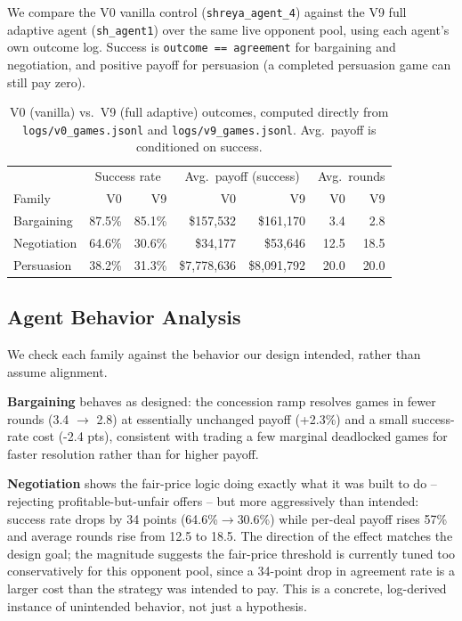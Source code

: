 \documentclass{article}
\begin{document}
We compare the V0 vanilla control (\texttt{shreya\_agent\_4}) against the V9 full adaptive agent (\texttt{sh\_agent1}) over the same live opponent pool, using each agent's own outcome log. Success is \texttt{outcome == agreement} for bargaining and negotiation, and positive payoff for persuasion (a completed persuasion game can still pay zero).

\begin{table}[t]
\caption{V0 (vanilla) vs.\ V9 (full adaptive) outcomes, computed directly from \texttt{logs/v0\_games.jsonl} and \texttt{logs/v9\_games.jsonl}. Avg.\ payoff is conditioned on success.}
\label{tab:v0v9}
\centering
\small
\begin{tabular}{lrrrrrr}
\toprule
& \multicolumn{2}{c}{Success rate} & \multicolumn{2}{c}{Avg.\ payoff (success)} & \multicolumn{2}{c}{Avg.\ rounds} \\
Family & V0 & V9 & V0 & V9 & V0 & V9 \\
\midrule
Bargaining  & 87.5\% & 85.1\% & \$157{,}532 & \$161{,}170 & 3.4 & 2.8 \\
Negotiation & 64.6\% & 30.6\% & \$34{,}177  & \$53{,}646  & 12.5 & 18.5 \\
Persuasion  & 38.2\% & 31.3\% & \$7{,}778{,}636 & \$8{,}091{,}792 & 20.0 & 20.0 \\
\bottomrule
\end{tabular}
\end{table}

\subsection{Agent Behavior Analysis}
\label{sec:behavior}

We check each family against the behavior our design intended, rather than assume alignment.

\textbf{Bargaining} behaves as designed: the concession ramp resolves games in fewer rounds (3.4 $\to$ 2.8) at essentially unchanged payoff (+2.3\%) and a small success-rate cost (-2.4 pts), consistent with trading a few marginal deadlocked games for faster resolution rather than for higher payoff.

\textbf{Negotiation} shows the fair-price logic doing exactly what it was built to do -- rejecting profitable-but-unfair offers -- but more aggressively than intended: success rate drops by 34 points (64.6\%$\to$30.6\%) while per-deal payoff rises 57\% and average rounds rise from 12.5 to 18.5. The direction of the effect matches the design goal; the magnitude suggests the fair-price threshold is currently tuned too conservatively for this opponent pool, since a 34-point drop in agreement rate is a larger cost than the strategy was intended to pay. This is a concrete, log-derived instance of unintended behavior, not just a hypothesis.
\end{document}
